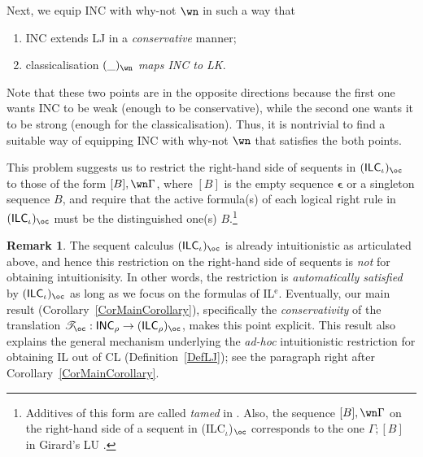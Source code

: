 \documentclass[a4paper]{article}
\theoremstyle{definition}
\newtheorem{remark}[definition]{Remark}
\theoremstyle{theorem}
\theoremstyle{remark}
\begin{document}
Next, we equip \textsf{INC} with why-not $\wn$ in such a way that
\begin{enumerate}

\item \textsf{INC} extends \textsf{LJ} in a \emph{conservative} manner;

\item classicalisation $(\_)_\wn$ \emph{maps \textsf{INC} to \textsf{LK}}.

\end{enumerate}
Note that these two points are in the opposite directions because the first one wants \textsf{INC} to be weak (enough to be conservative), while the second one wants it to be strong (enough for the classicalisation).
Thus, it is nontrivial to find a suitable way of equipping \textsf{INC} with why-not $\wn$ that satisfies the both points.
\fi

This problem suggests us to restrict the right-hand side of sequents in $(\textsf{ILC$_\iota$})_\oc$ to those of the form $[B], \wn \Gamma$, where $[B]$ is the empty sequence $\boldsymbol{\epsilon}$ or a singleton sequence $B$, and require that the active formula(s) of each logical right rule in $(\textsf{ILC$_\iota$})_\oc$ must be the distinguished one(s) $B$.\footnote{Additives of this form are called \emph{tamed} in \cite[\S 2.3]{danos1997new}. Also, the sequence $[B], \wn \Gamma$ on the right-hand side of a sequent in (\textsf{ILC}$_\iota$)$_\oc$ corresponds to the one $\Gamma ; [B]$ in Girard's \textsf{LU} \cite{girard1993unity}.}

\begin{remark}
\label{RemarkOnIntuitionisity}
The sequent calculus $(\textsf{ILC$_\iota$})_\oc$ is already intuitionistic as articulated above, and hence this restriction on the right-hand side of sequents is \emph{not} for obtaining intuitionisity.
In other words, the restriction is \emph{automatically satisfied} by $(\textsf{ILC$_\iota$})_\oc$ as long as we focus on the formulas of IL$^{\text{e}}$. %
Eventually, our main result (Corollary~\ref{CorMainCorollary}), specifically the \emph{conservativity} of the translation $\mathscr{T}_\oc : \textsf{INC}_\rho \rightarrow (\textsf{ILC}_\rho)_\oc$, makes this point explicit.
This result also explains the general mechanism underlying the \emph{ad-hoc} intuitionistic restriction for obtaining IL out of CL (Definition~\ref{DefLJ}); see the paragraph right after Corollary~\ref{CorMainCorollary}.
\end{remark}
\end{document}
